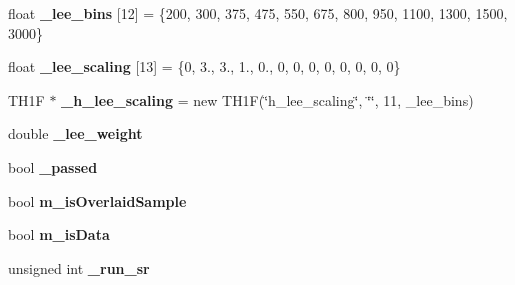 \begin{DoxyCompactItemize}
\item 
\hypertarget{classlee_1_1ElectronNeutrinoFilter_afe0c623e95ee20604061b1b9af89fcae}{float {\bfseries \-\_\-lee\-\_\-bins} \mbox{[}12\mbox{]} = \{200, 300, 375, 475, 550, 675, 800, 950, 1100, 1300, 1500, 3000\}}\label{classlee_1_1ElectronNeutrinoFilter_afe0c623e95ee20604061b1b9af89fcae}

\item 
\hypertarget{classlee_1_1ElectronNeutrinoFilter_a3c12458489f044717ce4acbb46ec8a5c}{float {\bfseries \-\_\-lee\-\_\-scaling} \mbox{[}13\mbox{]} = \{0, 3., 3., 1., 0., 0, 0, 0, 0, 0, 0, 0, 0\}}\label{classlee_1_1ElectronNeutrinoFilter_a3c12458489f044717ce4acbb46ec8a5c}

\item 
\hypertarget{classlee_1_1ElectronNeutrinoFilter_a4603c127eb117ed2e1cb0cc2f9ab8305}{T\-H1\-F $\ast$ {\bfseries \-\_\-h\-\_\-lee\-\_\-scaling} = new T\-H1\-F(\char`\"{}h\-\_\-lee\-\_\-scaling\char`\"{}, \char`\"{}\char`\"{}, 11, \-\_\-lee\-\_\-bins)}\label{classlee_1_1ElectronNeutrinoFilter_a4603c127eb117ed2e1cb0cc2f9ab8305}

\item 
\hypertarget{classlee_1_1ElectronNeutrinoFilter_a709a8b99dfeeecb1bcfa257b68720668}{double {\bfseries \-\_\-lee\-\_\-weight}}\label{classlee_1_1ElectronNeutrinoFilter_a709a8b99dfeeecb1bcfa257b68720668}

\item 
\hypertarget{classlee_1_1ElectronNeutrinoFilter_a33bf99b17017e472dc71e7e2cf48c1e6}{bool {\bfseries \-\_\-passed}}\label{classlee_1_1ElectronNeutrinoFilter_a33bf99b17017e472dc71e7e2cf48c1e6}

\item 
\hypertarget{classlee_1_1ElectronNeutrinoFilter_acba0453be53b5ce2cdf28552611f6711}{bool {\bfseries m\-\_\-is\-Overlaid\-Sample}}\label{classlee_1_1ElectronNeutrinoFilter_acba0453be53b5ce2cdf28552611f6711}

\item 
\hypertarget{classlee_1_1ElectronNeutrinoFilter_abc078c72f7360f21250dfa5f16eace15}{bool {\bfseries m\-\_\-is\-Data}}\label{classlee_1_1ElectronNeutrinoFilter_abc078c72f7360f21250dfa5f16eace15}

\item 
\hypertarget{classlee_1_1ElectronNeutrinoFilter_a18314044dbcc5e207627d51bf023caa3}{unsigned int {\bfseries \-\_\-run\-\_\-sr}}\label{classlee_1_1ElectronNeutrinoFilter_a18314044dbcc5e207627d51bf023caa3}


\end{DoxyCompactItemize}
